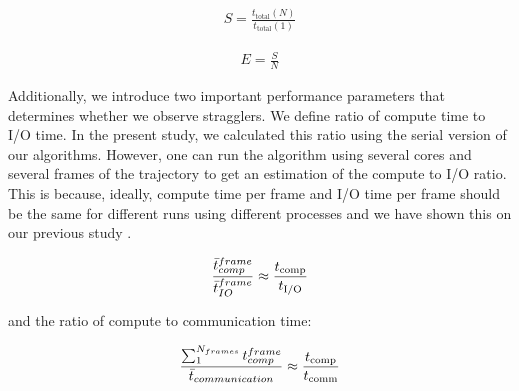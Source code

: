 \begin{gather}
  \label{eq:speedup}
  S = \frac{t_{\text{total}}(N)}{t_{\text{total}}(1)}
\end{gather}

\begin{gather}
  \label{eq:efficiency}
  E = \frac{S}{N}
\end{gather}

Additionally, we introduce two important performance parameters that determines whether we observe stragglers.
We define ratio of compute time to I/O time. 
In the present study, we calculated this ratio using the serial version of our algorithms.
However, one can run the algorithm using several cores and several frames of the trajectory to get an estimation of the compute to I/O ratio. 
This is because, ideally, compute time per frame and I/O time per frame should be the same for different runs using different processes and we have shown this on our previous study \cite{Khoshlessan:2017ab}.

\begin{gather}
  \label{eq:Compute-I/O}
    \frac{\bar{t}_{comp}^{frame}}{\bar{t}_{IO}^{frame}} \approx \frac{{t}_{\text{comp}}}{{t}_{\text{I/O}}} 
 \end{gather}

and the ratio of compute to communication time:

\begin{gather}
  \label{eq:Compute-comm}
    \frac{\sum_{1}^{N_{frames}}t_{comp}^{frame}}{\bar{t}_{communication}} \approx \frac{{t}_{\text{comp}}}{t_{\text{comm}}} 
 \end{gather}
 
